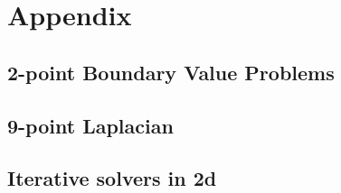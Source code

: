 \documentclass[12pt, a4paper, titlepage]{article} %
\begin{document}
% 

%


\tableofcontents
\newpage






% 

\clearpage
\appendix
\section{Appendix}
\subsection{2-point Boundary Value Problems}






\subsection{9-point Laplacian}





\subsection{Iterative solvers in 2d}









\end{document}
